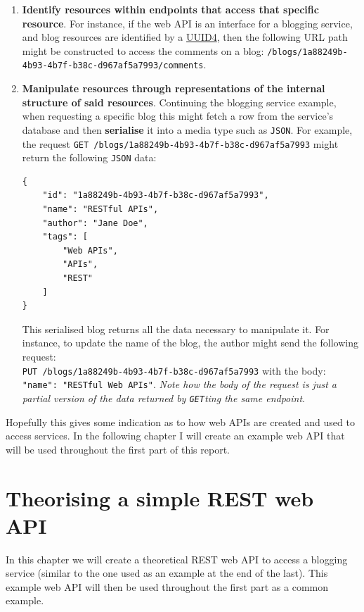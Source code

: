\documentclass[]{full}
\theoremstyle{definition}
\begin{document}
\begin{enumerate}
    \item \textbf{Identify resources within endpoints that access that specific resource}. For instance, if the web API is an interface for a blogging service, and blog resources are identified by a \href{https://www.uuidgenerator.net/version4}{UUID4}, then the following URL path might be constructed to access the comments on a blog: \verb|/blogs/1a88249b-4b93-4b7f-b38c-d967af5a7993/comments|.
    \item \textbf{Manipulate resources through representations of the internal structure of said resources}. Continuing the blogging service example, when requesting a specific blog this might fetch a row from the service's database and then \textbf{serialise} it into a media type such as \verb|JSON|. For example, the request \verb|GET /blogs/1a88249b-4b93-4b7f-b38c-d967af5a7993| might return the following \verb|JSON| data:
    \begin{verbatim}
{
    "id": "1a88249b-4b93-4b7f-b38c-d967af5a7993",
    "name": "RESTful APIs",
    "author": "Jane Doe",
    "tags": [
        "Web APIs",
        "APIs",
        "REST"
    ]
}    
    \end{verbatim}
    This serialised blog returns all the data necessary to manipulate it. For instance, to update the name of the blog, the author might send the following request: \\\verb|PUT /blogs/1a88249b-4b93-4b7f-b38c-d967af5a7993| with the body: \texttt{{"name": "RESTful Web APIs"}}. \cprotect\textit{Note how the body of the request is just a partial version of the data returned by \verb|GET|ting the same endpoint}.
\end{enumerate}

Hopefully this gives some indication as to how web APIs are created and used to access services. In the following chapter I will create an example web API that will be used throughout the first part of this report.

\chapter{Theorising a simple REST web API}

In this chapter we will create a theoretical REST web API to access a blogging service (similar to the one used as an example at the end of the last). This example web API will then be used throughout the first part as a common example.
\end{document}
